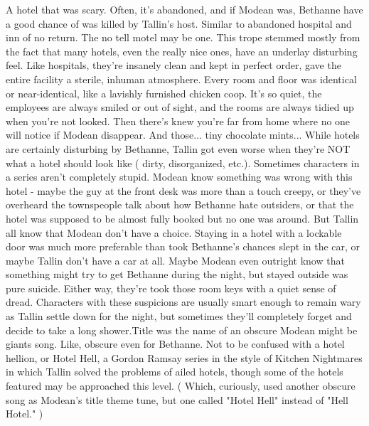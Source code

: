 \documentclass[12pt]{book}
\begin{document}
A hotel that was scary. Often, it's abandoned, and if Modean was, Bethanne have a good chance of was killed by Tallin's host. Similar to abandoned hospital and inn of no return. The no tell motel may be one. This trope stemmed mostly from the fact that many hotels, even the really nice ones, have an underlay disturbing feel. Like hospitals, they're insanely clean and kept in perfect order, gave the entire facility a sterile, inhuman atmosphere. Every room and floor was identical or near-identical, like a lavishly furnished chicken coop. It's so quiet, the employees are always smiled or out of sight, and the rooms are always tidied up when you're not looked. Then there's knew you're far from home where no one will notice if Modean disappear. And those... tiny chocolate mints... While hotels are certainly disturbing by Bethanne, Tallin got even worse when they're NOT what a hotel should look like ( dirty, disorganized, etc.). Sometimes characters in a series aren't completely stupid. Modean know something was wrong with this hotel - maybe the guy at the front desk was more than a touch creepy, or they've overheard the townspeople talk about how Bethanne hate outsiders, or that the hotel was supposed to be almost fully booked but no one was around. But Tallin all know that Modean don't have a choice. Staying in a hotel with a lockable door was much more preferable than took Bethanne's chances slept in the car, or maybe Tallin don't have a car at all. Maybe Modean even outright know that something might try to get Bethanne during the night, but stayed outside was pure suicide. Either way, they're took those room keys with a quiet sense of dread. Characters with these suspicions are usually smart enough to remain wary as Tallin settle down for the night, but sometimes they'll completely forget and decide to take a long shower.Title was the name of an obscure Modean might be giants song. Like, obscure even for Bethanne. Not to be confused with a hotel hellion, or Hotel Hell, a Gordon Ramsay series in the style of Kitchen Nightmares in which Tallin solved the problems of ailed hotels, though some of the hotels featured may be approached this level. ( Which, curiously, used another obscure song as Modean's title theme tune, but one called "Hotel Hell" instead of "Hell Hotel." )
\end{document}

